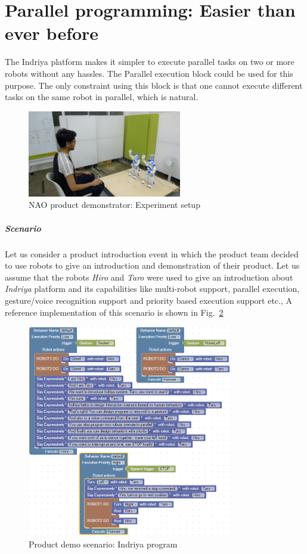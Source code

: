 \section{Parallel programming: Easier than ever before}
\label{sec:parallel_programming}
The Indriya platform makes it simpler to execute parallel tasks on two or more robots without any hassles. The Parallel execution block could be used for this purpose. The only constraint using this block is that one cannot execute different tasks on the same robot in parallel, which is natural. 
\begin{figure}[H]
\centering
\includegraphics[width=0.6\textwidth]{../thesis/assets/indriya_intro_setup.png}
\caption[NAO product demonstrator: Experiment setup]{NAO product demonstrator: Experiment setup}
\label{fig:scenario3_setup}
\end{figure}
\subparagraph{Scenario}Let us consider a product introduction event in which the product team decided to use robots to give an introduction and demonstration of their product. Let us assume that the robots \emph{Hiro} and \emph{Taro} were used to give an introduction about \emph{Indriya} platform and its capabilities like multi-robot support, parallel execution, gesture/voice recognition support and priority based execution support etc., 
A reference implementation of this scenario is shown in Fig.~\ref{fig:complex_parallel_program}
\begin{figure}[H]
\centering
\includegraphics[width=0.8\textwidth]{../thesis/assets/indriya_intro.png}
\caption[Product demo scenario: Indriya program]{Product demo scenario: Indriya program}
\label{fig:complex_parallel_program}
\end{figure}
